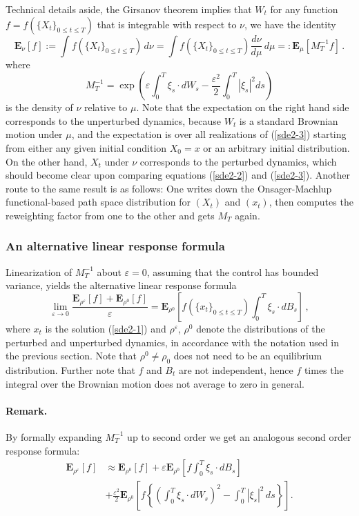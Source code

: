 \documentclass[]{tMPH2e}
\newcommand{\eps}{\varepsilon}
\newcommand{\bE}{{\mathbf E}}
\newcommand{\wrt}{with respect to }
\begin{document}
Technical details aside, the Girsanov theorem implies that $W_{t}$  for any function $f=f(\{X_{t}\}_{0\le t\le T})$ that is integrable \wrt $\nu$, we have the identity
\[
\bE_{\nu}[f] := \int f(\{X_{t}\}_{0\le t\le T})\, d\nu = \int f(\{X_{t}\}_{0\le t\le T}) \frac{d\nu}{d\mu}\,d\mu =: \bE_{\mu}[M^{-1}_{T}f]\,.
\]
where 
\[
M_{T}^{-1} = \exp\left(\eps\int_{0}^{T}\xi_{s}\cdot dW_{s} - \frac{\eps^{2}}{2}\int_{0}^{T}|\xi_{s}|^{2}ds\right)
\]
is the density of $\nu$ relative to $\mu$. Note that the expectation on the right hand side corresponds to the unperturbed dynamics, because $W_{t}$ is a standard Brownian motion under $\mu$, and the expectation is over all realizations of (\ref{sde2-3}) starting from either any given initial condition $X_{0}=x$ or an arbitrary initial distribution. On the other hand, $X_{t}$ under $\nu$ corresponds to the perturbed dynamics, which should become clear upon comparing equations (\ref{sde2-2}) and (\ref{sde2-3}). Another route to the same result is as follows: One writes down the Onsager-Machlup functional-based path space distribution \cite{Pinski1} for $(X_t)$ and $(x_t)$, then computes the reweighting factor from one to the other and gets $M_T$ again. 

\subsubsection*{An alternative linear response formula}

Linearization of $M_{T}^{-1}$ about $\eps=0$, assuming that the control has bounded variance, yields the alternative linear response formula 
\begin{equation}\label{lr-alt}
\lim_{\eps\to 0}\frac{\bE_{\rho^{\eps}}[f] + \bE_{\rho^{0}}[f]}{\eps} = \bE_{\rho^{0}}\left[f(\{x_{t}\}_{0\le t\le T})\int_{0}^{T}\xi_{s}\cdot dB_{s} \right]\,,
\end{equation}
where $x_{t}$ is the solution (\ref{sde2-1}) and $\rho^{\eps}$, $\rho^{0}$ denote the distributions of the perturbed and unperturbed dynamics, in accordance with the notation used in the previous section. Note that $\rho^{0}\neq\rho_{0}$ does not need to be an equilibrium distribution. Further note that $f$ and $B_{t}$ are not independent, hence $f$ times the integral over the Brownian motion does not average to zero in general. 


\paragraph*{Remark.} 
 By formally expanding $M^{-1}_T$ up to second order we get an analogous second order response formula: 
\begin{equation}\label{2nd}
\begin{aligned}
\bE_{\rho^{\eps}}[f] & \approx \bE_{\rho^{0}}[f]  + \eps \bE_{\rho^{0}}\left[f\int_{0}^{T}\xi_{s}\cdot dB_{s} \right]\\  
& + \frac{\eps^{2}}{2} \bE_{\rho^{0}}\left[f\left\{\left(\int_{0}^{T}\xi_{s}\cdot dW_{s}\right)^2 -\int_0^T |\xi_s|^2\,ds\right\} \right].
\end{aligned}
\end{equation}
 
\end{document}
